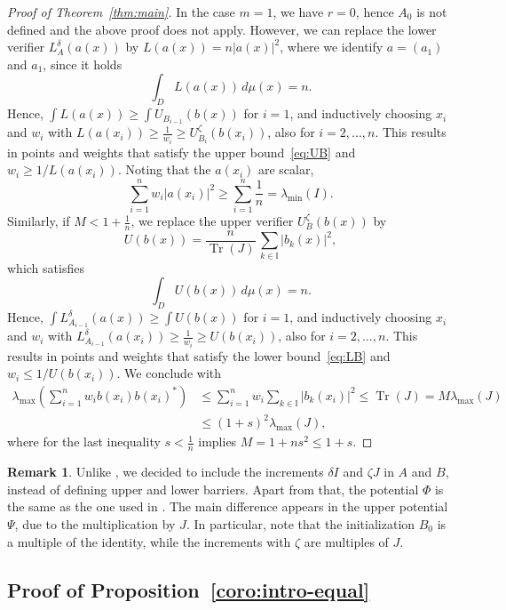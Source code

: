 \documentclass[a4paper,11pt]{article}
\renewcommand{\(}{\left (}
\renewcommand{\)}{\right )}
\newcommand{\<}{\langle}
\renewcommand{\>}{\rangle}
\theoremstyle{definition}
\newtheorem{remark}[theorem]{Remark}
\DeclareMathOperator{\Tr}{Tr}
\begin{document}
\begin{proof}[Proof of Theorem~\ref{thm:main}]
In the case $m=1$, we have $r=0$, hence $A_0$ is not defined and the above proof does not apply. However, we can replace the lower verifier $L_A^\delta(a(x))$ by $L(a(x))=n|a(x)|^2$, 
where we identify $a=(a_1)$ and $a_1$,
since it holds
\[
\int_D L(a(x))\,d\mu(x)=n.
\]
Hence, $\int L(a(x)) \ge \int U_{B_{i-1}}(b(x))$ for $i=1$,
and inductively choosing $x_i$ and $w_i$ with $L(a(x_i)) \ge \frac{1}{w_i} \ge U_{B_i}^\zeta(b(x_i))$,
also for $i=2,...,n$.
This results in points and weights that satisfy the upper bound~\eqref{eq:UB} and $w_i\geq 1/L(a(x_i))$.  Noting that the $a(x_i)$ are scalar,
\[
\sum_{i=1}^n w_i |a(x_i)|^2\geq \sum_{i=1}^n \frac{1}{n}=\lambda_{\min}(I).
\]
Similarly, if $M<1+\frac{1}{n}$, 
we replace the upper verifier $U_B^\zeta(b(x))$ by
\[
U(b(x))=\frac{n}{\Tr(J)}\,\sum_{k\in\mathbb{I}}|b_k(x)|^2,
\]
which satisfies
\[
\int_D U(b(x))\,d\mu(x)=n.
\]
Hence, $\int L^\delta_{A_{i-1}}(a(x)) \ge \int U(b(x))$ for $i=1$,
and inductively choosing $x_i$ and $w_i$ with $L^\delta_{A_{i-1}}(a(x_i)) \ge \frac{1}{w_i} \ge U(b(x_i))$,
also for $i=2,...,n$.
This results in points and weights that satisfy the lower bound~\eqref{eq:LB} and $w_i\leq 1/U(b(x_i))$.
We conclude with
\[\begin{split}
\lambda_{\max}\left(\sum_{i=1}^{n} w_i b(x_i) b(x_i)^*
\right)
&\leq\sum_{i=1}^{n} w_i \sum_{k\in\mathbb{I}}|b_k(x_i)|^2 
\leq
\Tr(J)=M\lambda_{\max}(J) \\ 
&\leq (1+s)^2\lambda_{\max}(J),
\end{split}\]
where for the last inequality $s<\frac{1}{n}$ implies $M=1+ns^2\leq 1+s$.
\end{proof}

\begin{remark}
Unlike \cite{BSS}, we decided to include the increments $\delta I$ and $\zeta J$ in $A$ and $B$, instead of defining upper and lower barriers. Apart from that, the potential $\Phi$ is the same as the one used in \cite{BSS}. The main difference appears in the upper potential $\Psi$, due to the multiplication by $J$. In particular, note that the initialization $B_0$ is a multiple of the identity, while the increments with $\zeta$ are multiples of $J$.
\end{remark}


\subsection{Proof of Proposition~\ref{coro:intro-equal}}
\label{sec:proof-coro}
\end{document}
